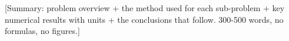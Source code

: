 
[Summary: problem overview + the method used for each sub-problem + key numerical
results with units + the conclusions that follow. 300-500 words, no formulas,
no figures.]
